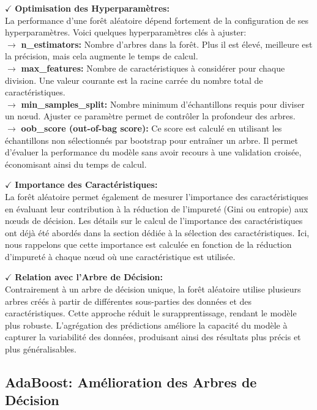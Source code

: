 \textbf{\(\checkmark\)} \textbf{Optimisation des Hyperparamètres:}\\
La performance d'une forêt aléatoire dépend fortement de la configuration de ses hyperparamètres. Voici quelques hyperparamètres clés à ajuster:\\
\noindent \textbf{\(\rightarrow\)} \textbf{n\_estimators:} Nombre d’arbres dans la forêt. Plus il est élevé, meilleure est la précision, mais cela augmente le temps de calcul.\\
\noindent \textbf{\(\rightarrow\)} \textbf{max\_features:} Nombre de caractéristiques à considérer pour chaque division. Une valeur courante est la racine carrée du nombre total de caractéristiques.\\
\noindent \textbf{\(\rightarrow\)} \textbf{min\_samples\_split:} Nombre minimum d’échantillons requis pour diviser un nœud. Ajuster ce paramètre permet de contrôler la profondeur des arbres.\\
\noindent \textbf{\(\rightarrow\)} \textbf{oob\_score (out-of-bag score):} Ce score est calculé en utilisant les échantillons non sélectionnés par bootstrap pour entraîner un arbre. Il permet d’évaluer la performance du modèle sans avoir recours à une validation croisée, économisant ainsi du temps de calcul.

\textbf{\(\checkmark\)} \textbf{Importance des Caractéristiques:}\\
La forêt aléatoire permet également de mesurer l'importance des caractéristiques en évaluant leur contribution à la réduction de l'impureté (Gini ou entropie) aux nœuds de décision. Les détails sur le calcul de l'importance des caractéristiques ont déjà été abordés dans la section dédiée à la sélection des caractéristiques. Ici, nous rappelons que cette importance est calculée en fonction de la réduction d'impureté à chaque nœud où une caractéristique est utilisée.

\textbf{\(\checkmark\)} \textbf{Relation avec l'Arbre de Décision:}\\
Contrairement à un arbre de décision unique, la forêt aléatoire utilise plusieurs arbres créés à partir de différentes sous-parties des données et des caractéristiques. Cette approche réduit le surapprentissage, rendant le modèle plus robuste. L'agrégation des prédictions améliore la capacité du modèle à capturer la variabilité des données, produisant ainsi des résultats plus précis et plus généralisables.

\subsection{AdaBoost: Amélioration des Arbres de Décision}

